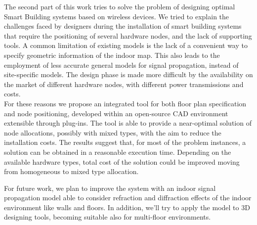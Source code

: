 The second part of this work tries to solve the problem of designing optimal Smart Building systems based on wireless devices. We tried to explain the challenges faced by designers during the installation of smart building systems that require the positioning of several hardware nodes, and the lack of supporting tools. A common limitation of existing models is the lack of a convenient way to specify geometric information of the indoor map. This also leads to the employment of less accurate general models for signal propagation, instead of site-specific models. The design phase is made more difficult by the availability on the market of different hardware nodes, with different power transmissions and costs.\\
For these reasons we propose an integrated tool for both floor plan specification and node positioning, developed within an \mbox{open-source} CAD environment extensible through plug-ins. The tool is able to provide a near-optimal solution of node allocations, possibly with mixed types, with the aim to reduce the installation costs. The results suggest that, for most of the problem instances, a solution can be obtained in a reasonable execution time. Depending on the available hardware types, total cost of the solution could be improved moving from homogeneous to mixed type allocation.

For future work, we plan to improve the system with an indoor signal propagation model able to consider refraction and diffraction effects of the indoor environment like walls and floors. In addition, we'll try to apply the model to 3D designing tools, becoming suitable also for multi-floor environments.
%
